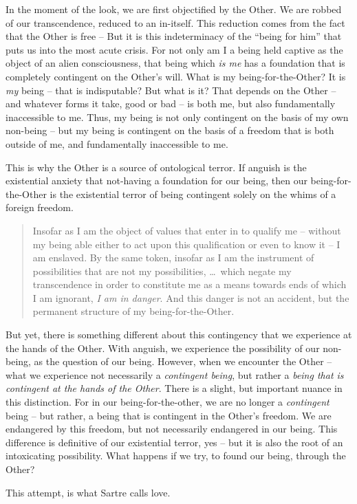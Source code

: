In the moment of the look, we are first objectified by the Other. We are robbed of our transcendence, reduced to an in-itself. This reduction comes from the fact that the Other is free --  But it is this indeterminacy of the \enquote{being for him} that puts us into the most acute crisis. For not only am I a being held captive as the object of an alien consciousness, that being which \emph{is me} has a foundation that is completely contingent on the Other's will. What is my being-for-the-Other? It is \emph{my} being -- that is indisputable? But what is it? That depends on the Other -- and whatever forms it take, good or bad -- is both me, but also fundamentally inaccessible to me.  Thus, my being is not only contingent on the basis of my own non-being -- but my being is contingent on the basis of a freedom that is both outside of me, and fundamentally inaccessible to me.

This is why the Other is a source of ontological terror. If anguish is the existential anxiety that not-having a foundation for our being, then our being-for-the-Other is the existential terror of being contingent solely on the whims of a foreign freedom. 

\blockcquote[366]{Sartre}{Insofar as I am the object of values that enter in to qualify me -- without my being able either to act upon this qualification or even to know it -- I am enslaved. By the same token, insofar as I am the instrument of possibilities that are not my possibilities, \ldots\ which negate my transcendence in order to constitute me as a means towards ends of which I am ignorant, \emph{I am in danger}. And this danger is not an accident, but the permanent structure of my being-for-the-Other.}

\noindent
But yet, there is something different about this contingency that we experience at the hands of the Other. With anguish, we experience the possibility of our non-being, as the question of our being. However, when we encounter the Other -- what we experience not necessarily a \emph{contingent being}, but rather a \emph{being that is contingent at the hands of the Other}. There is a slight, but important nuance in this distinction. For in our being-for-the-other, we are no longer a \emph{contingent} being -- but rather, a being that is contingent in the Other's freedom. We are endangered by this freedom, but not necessarily endangered in our being. This difference is definitive of our existential terror, yes -- but it is also the root of an intoxicating possibility. What happens if we try, to found our being, through the Other?

This attempt, is what Sartre calls love.